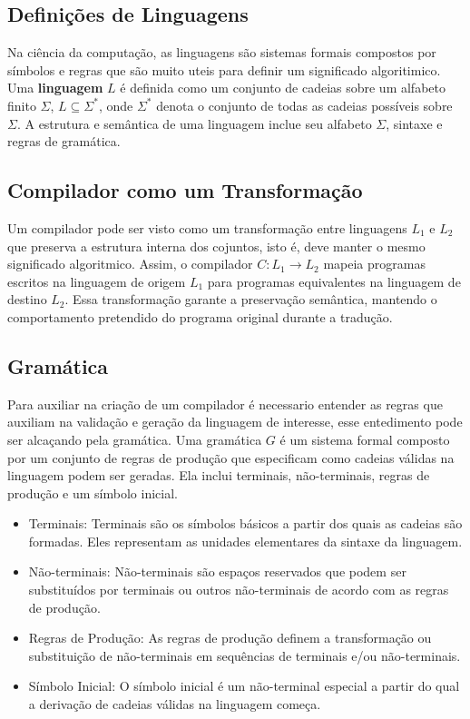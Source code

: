 \documentclass[english, 
               brazil, 
               bsc] %
               {dcomp-abntex2}
\begin{document}
\subsection{Definições de Linguagens}

Na ciência da computação, as linguagens são sistemas formais compostos por símbolos e regras que são muito uteis para definir um significado algoritimico. Uma \textbf{linguagem} $L$ é definida como um conjunto de cadeias sobre um alfabeto finito $ \Sigma $, $ L \subseteq \Sigma^* $, onde  $ \Sigma^* $ denota o conjunto de todas as cadeias possíveis sobre $ \Sigma $. A estrutura e semântica de uma linguagem  inclue seu alfabeto $ \Sigma $, sintaxe e regras de gramática.

\subsection{Compilador como um Transformação}

Um compilador pode ser visto como um transformação entre linguagens $ L_1 $ e $ L_2 $ que preserva a estrutura interna dos cojuntos, isto é, deve manter o mesmo significado algoritmico. Assim, o compilador $ C: L_1 \rightarrow L_2 $ mapeia programas escritos na linguagem de origem $ L_1 $ para programas equivalentes na linguagem de destino $ L_2 $. Essa transformação garante a preservação semântica, mantendo o comportamento pretendido do programa original durante a tradução.


\subsection{Gramática}

Para auxiliar na criação de um compilador é necessario entender as regras que auxiliam na validação e geração da linguagem de interesse, esse entedimento pode ser alcaçando pela gramática. Uma gramática $ G $ é um sistema formal composto por um conjunto de regras de produção que especificam como cadeias válidas na linguagem podem ser geradas. Ela inclui terminais, não-terminais, regras de produção e um símbolo inicial.

\begin{itemize}
  \item Terminais: Terminais são os símbolos básicos a partir dos quais as cadeias são formadas. Eles representam as unidades elementares da sintaxe da linguagem.
  \item Não-terminais: Não-terminais são espaços reservados que podem ser substituídos por terminais ou outros não-terminais de acordo com as regras de produção.

  \item Regras de Produção: As regras de produção definem a transformação ou substituição de não-terminais em sequências de terminais e/ou não-terminais.

  \item Símbolo Inicial: O símbolo inicial é um não-terminal especial a partir do qual a derivação de cadeias válidas na linguagem começa.
\end{itemize}
\end{document}

